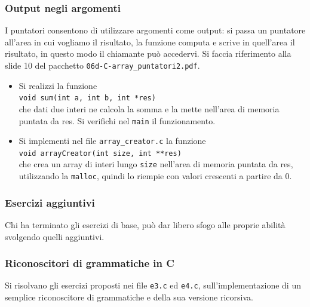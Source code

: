 \documentclass{beamer}
\begin{document}
\begin{frame}
\frametitle{Output negli argomenti}
I puntatori consentono di utilizzare argomenti come output: si passa un puntatore all'area in cui vogliamo il risultato, la funzione computa e scrive in quell'area il risultato, in questo modo il chiamante può accedervi. Si faccia riferimento alla slide 10 del pacchetto \texttt{06d-C-array\_puntatori2.pdf}.
\begin{itemize}
 \item Si realizzi la funzione\\ \texttt{void sum(int a, int b, int *res)} \\che dati due interi ne calcola la somma e la mette nell'area di memoria puntata da res. Si verifichi nel \texttt{main} il funzionamento.
 \item Si implementi nel file \texttt{array\_creator.c} la funzione\\ \texttt{void arrayCreator(int size, int **res)} \\che crea un array di interi lungo \texttt{size} nell'area di memoria puntata da res, utilizzando la \texttt{malloc}, quindi lo riempie con valori crescenti a partire da 0.
\end{itemize}
\end{frame}

\begin{frame}
\frametitle{Esercizi aggiuntivi}
Chi ha terminato gli esercizi di base, può dar libero sfogo alle proprie abilità svolgendo quelli aggiuntivi.
\end{frame}

\begin{frame}
\frametitle{Riconoscitori di grammatiche in C}
Si risolvano gli esercizi proposti nei file \texttt{e3.c} ed \texttt{e4.c}, sull'implementazione di un semplice riconoscitore di grammatiche e della sua versione ricorsiva.
\end{frame}
\end{document}
